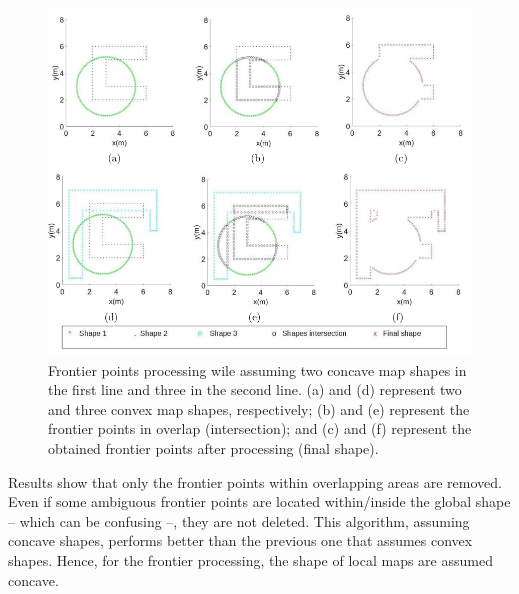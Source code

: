 \documentclass[11pt,openany]{book}
\begin{document}
\begin{figure}[H]
    \centering
    \includegraphics[scale=0.4]{assets/3_7.png}
    \caption{Frontier points processing wile assuming two concave map shapes in the first line and three in the second line. (a) and (d) represent two and three convex map shapes, respectively; (b) and (e) represent the frontier points in overlap (intersection); and (c) and (f) represent the obtained frontier points after processing (final shape).}
    \label{fig:3.7}
\end{figure}
Results show that only the frontier points within overlapping areas are removed. Even if some ambiguous frontier points are located within/inside the global shape – which can be confusing –, they are not deleted. This algorithm, assuming concave shapes, performs better than the previous one that assumes convex shapes. Hence, for the frontier processing, the shape of local maps are assumed concave.
\end{document}
